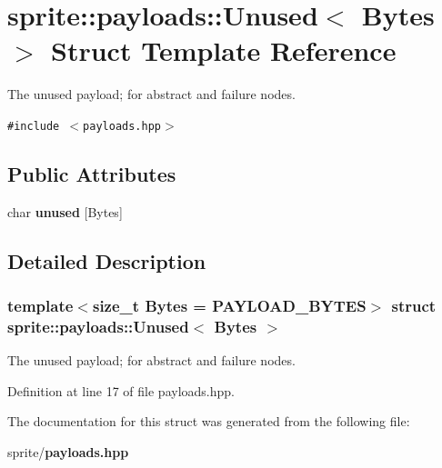 \section{sprite::payloads::Unused$<$ Bytes $>$ Struct Template Reference}
\label{structsprite_1_1payloads_1_1Unused}
The unused payload; for abstract and failure nodes.  


{\tt \#include $<$payloads.hpp$>$}

\subsection*{Public Attributes}
\begin{CompactItemize}
\item 
char {\bf unused} [Bytes]\label{structsprite_1_1payloads_1_1Unused_o0}

\end{CompactItemize}


\subsection{Detailed Description}
\subsubsection*{template$<$size\_\-t Bytes = PAYLOAD\_\-BYTES$>$ struct sprite::payloads::Unused$<$ Bytes $>$}

The unused payload; for abstract and failure nodes. 



Definition at line 17 of file payloads.hpp.

The documentation for this struct was generated from the following file:\begin{CompactItemize}
\item 
sprite/{\bf payloads.hpp}\end{CompactItemize}
